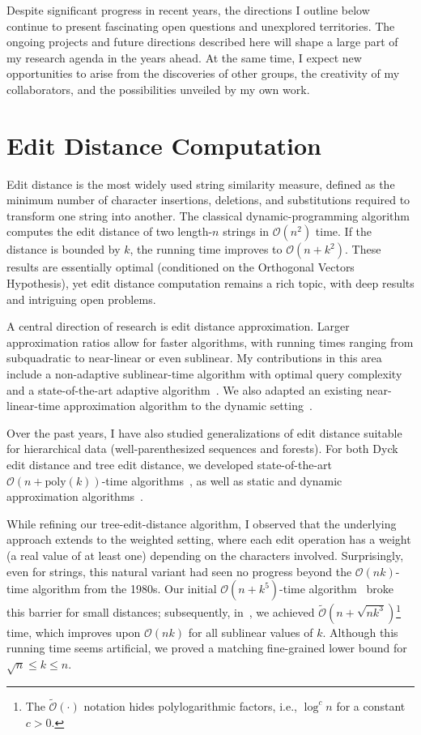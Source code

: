 \documentclass[a4paper,11pt]{article}
\newcommand{\Oh}{\mathcal{O}}
\newcommand{\Ohtilde}{\tilde{\mathcal{O}}}
\begin{document}
Despite significant progress in recent years, the directions I outline below continue to present fascinating open questions and unexplored territories. 
The ongoing projects and future directions described here will shape a large part of my research agenda in the years ahead. At the same time, I expect new opportunities to arise from the discoveries of other groups, the creativity of my collaborators, and the possibilities unveiled by my own work.

\section{Edit Distance Computation}
Edit distance is the most widely used string similarity measure, defined as the minimum number of character insertions, deletions, and substitutions required to transform one string into another. 
The classical dynamic-programming algorithm computes the edit distance of two \mbox{length-$n$} strings in $\Oh(n^2)$ time.
If the distance is bounded by $k$, the running time improves to $\Oh(n+k^2)$. 
These results are essentially optimal (conditioned on the Orthogonal Vectors Hypothesis), yet edit distance computation remains a rich topic, with deep results and intriguing open problems.

A central direction of research is edit distance approximation. Larger approximation ratios allow for faster algorithms, with running times ranging from subquadratic to near-linear or even sublinear. 
My contributions in this area include a non-adaptive sublinear-time algorithm with optimal query complexity~\cite{FOCS2022c} and a state-of-the-art adaptive algorithm~\cite{SODA2024a}.
We also adapted an existing near-linear-time approximation algorithm to the dynamic setting~\cite{FOCS2023c}.

Over the past years, I have also studied generalizations of edit distance suitable for hierarchical data (well-parenthesized sequences and forests). 
For both Dyck edit distance and tree edit distance, we developed state-of-the-art $\Oh(n+\mathrm{poly}(k))$-time algorithms~\cite{Fried2024,FOCS2022b,STOC2023,KS25}, as well as static and dynamic approximation algorithms~\cite{Das2022,Das2025}.

While refining our tree-edit-distance algorithm, I observed that the underlying approach extends to the weighted setting, where each edit operation has a weight (a real value of at least one) depending on the characters involved.
Surprisingly, even for strings, this natural variant had seen no progress beyond the $\Oh(nk)$-time algorithm from the 1980s. 
Our initial $\Oh(n+k^5)$-time algorithm~\cite{STOC2023} broke this barrier for small distances; subsequently, in~\cite{FOCS2023a}, we achieved $\Ohtilde(n+\sqrt{nk^3})$\footnote{The $\Ohtilde(\cdot)$ notation hides polylogarithmic factors, i.e., $\log^c n$ for a constant $c>0$.} time, which improves upon $\Oh(nk)$ for all sublinear values of $k$.
Although this running time seems artificial, we proved a matching fine-grained lower bound for $\sqrt{n} \le k \le n$.
\end{document}
